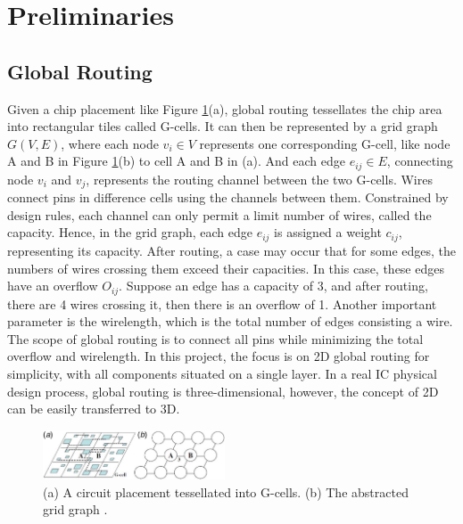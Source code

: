 \documentclass[conference]{IEEEtran}
\begin{document}
\section{Preliminaries}
\subsection{Global Routing}
Given a chip placement like Figure \ref{fig:gr}(a), global routing tessellates the chip area into rectangular tiles called G-cells. It can then be represented by a grid graph $G(V, E)$, where each node $v_{i} \in V$ represents one corresponding G-cell, like node A and B in Figure \ref{fig:gr}(b) to cell A and B in (a). And each edge $e_{ij} \in E$, connecting node $v_{i}$ and $v_{j}$, 
represents the routing channel between the two G-cells. Wires connect pins in difference cells using the channels between them. Constrained by design rules, 
each channel can only permit a limit number of wires, called the capacity. Hence, in the grid graph, each edge $e_{ij}$ is assigned a weight $c_{ij}$, representing its capacity. After routing, a case may occur that for some edges, the numbers of wires crossing them exceed their capacities. In this case, these edges have an overflow $O_{ij}$. Suppose an edge has a capacity of 3, and after routing, there are 4 wires crossing it, then there is an overflow of 1. Another important parameter is the wirelength, which is the total number of edges consisting a wire. The scope of global routing is to connect all pins while minimizing the total overflow and wirelength. In this project, the focus is on 2D global routing for simplicity, with all components situated on a single layer. In a real IC physical design process, global routing is three-dimensional, however, the concept of 2D can be easily transferred to 3D.

\begin{figure}[h!]
    \centering
    \includegraphics[width = 0.48\textwidth]{figures/gr.jpg}
    \caption{(a) A circuit placement tessellated into G-cells. (b) The abstracted grid graph \cite{Cho2006}.}
    \label{fig:gr}
\end{figure}
\end{document}
